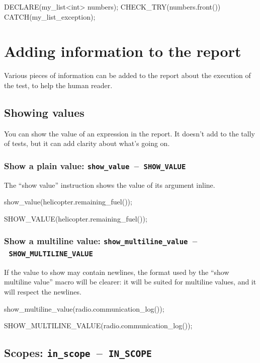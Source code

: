\documentclass[twoside, a4paper, article]{memoir}
\newcommand*\testudocolor{\color{red!80!blue}}
\newcommand*\testudo[1]{\texttt{\testudocolor{}#1}}
\newcommand*\testudopair[2]{\testudo{#1}~--~\testudo{#2}}
\newcommand\subsectiontestudopair[3]{%
  \subsection[#1]{#1: \testudopair{#2}{#3}}}
\newcommand\subsubsectiontestudopair[3]{%
  \subsubsection[#1]{#1: \testudopair{#2}{#3}}}
\begin{document}
\begin{cpplisting}
DECLARE(my_list<int> numbers);
CHECK_TRY(numbers.front()) CATCH(my_list_exception);
\end{cpplisting}


\section{Adding information to the report}
\label{sec:adding-information-report}

Various pieces of information can be added to the report about the execution of
the test, to help the human reader.

\subsection{Showing values}
\label{sec:showing-values}

You can show the value of an expression in the report.  It doesn't add to the
tally of tests, but it can add clarity about what's going on.

\subsubsectiontestudopair{Show a plain value}%
  {show\_value}{SHOW\_VALUE}
\label{sec:show-plain-value}

The ``show value'' instruction shows the value of its argument inline.

\begin{cpplisting}
show_value(helicopter.remaining_fuel());
\end{cpplisting}

\begin{cpplisting}
SHOW_VALUE(helicopter.remaining_fuel());
\end{cpplisting}

\subsubsectiontestudopair{Show a multiline value}
  {show\_multiline\_value}{SHOW\_MULTILINE\_VALUE}
\label{sec:show-multiline-value}

If the value to show may contain newlines, the format used by the ``show
multiline value'' macro will be clearer: it will be suited for multiline
values, and it will respect the newlines.

\begin{cpplisting}
show_multiline_value(radio.communication_log());
\end{cpplisting}

\begin{cpplisting}
SHOW_MULTILINE_VALUE(radio.communication_log());
\end{cpplisting}

\subsectiontestudopair{Scopes}{in\_scope}{IN\_SCOPE}
\label{sec:scopes}
\end{document}
